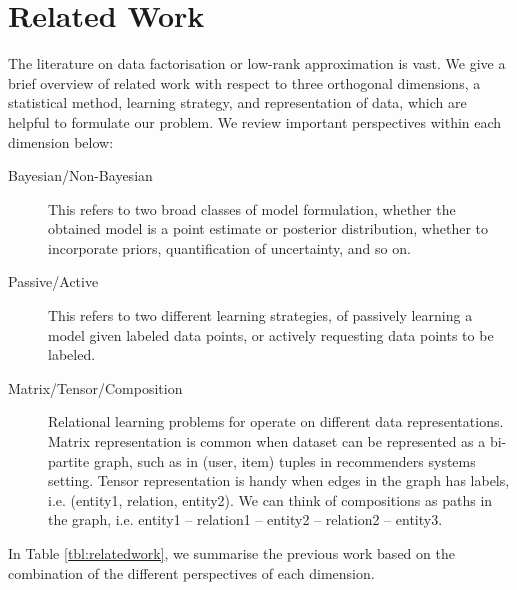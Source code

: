 
\section{Related Work}

The literature on data factorisation or low-rank approximation is vast. 
We give a brief overview of related work with respect to three
orthogonal dimensions, a statistical method, learning strategy, and 
representation of data, which are helpful to formulate our problem.
We review important perspectives within each dimension below:
\begin{description}
\item[Bayesian/Non-Bayesian] This refers to two broad classes of model 
formulation, whether the obtained model is a point estimate or posterior 
distribution, whether to incorporate priors, quantification of uncertainty, 
and so on. 
\item[Passive/Active] This refers to two different learning strategies, 
of passively learning a model given labeled data points, or actively 
requesting data points to be labeled.
\item[Matrix/Tensor/Composition] Relational learning problems for operate on 
different data representations. Matrix representation is common when dataset 
can be represented as a bi-partite graph, such as in (user, item) tuples in 
recommenders systems setting. Tensor representation is handy when edges in the 
graph has labels, i.e. (entity1, relation, entity2). We can think of 
compositions as paths in the graph, i.e. entity1 -- relation1 -- entity2 -- 
relation2 -- entity3.
\end{description}
In Table \ref{tbl:relatedwork}, we summarise the previous work based on 
the combination of the different perspectives of each dimension.

